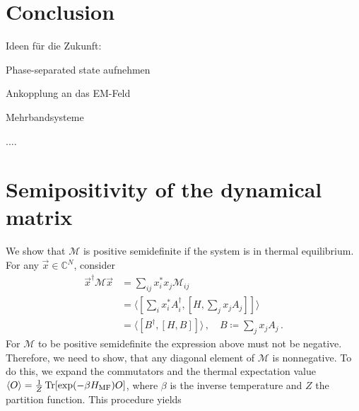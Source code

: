 \documentclass[
    reprint, 
    aps,
    preprintnumbers,
    twocolumn,
    prb,
    superscriptaddress
]{revtex4-2}
\newcommand{\mM}{\mathcal{M}}
\begin{document}
\section{Conclusion}\label{sec:conclusion}

Ideen für die Zukunft:

Phase-separated state aufnehmen

Ankopplung an das EM-Feld

Mehrbandsysteme

\begin{acknowledgments} 
    ....
\end{acknowledgments}

\appendix
\section{Semipositivity of the dynamical matrix}
\label{sec:positive_M}

We show that $\mathcal{M}$ is positive semidefinite if the system is in thermal equilibrium.
For any $\vec{x} \in \mathbb{C}^N$, consider
\begin{align}
    \vec{x}^\dagger \mM \vec{x} &= \sum_{ij} x_i^* x_j \mM_{ij} \nonumber \\
        &= \langle \left[ \sum_i x_i^* A_i^\dagger, \left[ H, \sum_j x_j A_j \right] \right]  \rangle \nonumber \\
        &= \langle [B^\dagger, [H, B]] \rangle\,,\quad B \coloneqq  \sum_j x_j A_j\,.
\end{align}
For $\mM$ to be positive semidefinite the expression above must not be negative.
Therefore, we need to show, that any diagonal element of $\mM$ is nonnegative.
To do this, we expand the commutators and the thermal expectation value $\langle O \rangle = \frac{1}{Z} \Trace [\exp(-\beta H_\text{MF}) O]$, 
where $\beta$ is the inverse temperature and $Z$ the partition function.
This procedure yields
\end{document}

